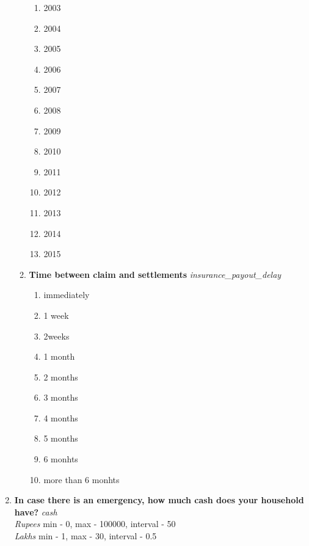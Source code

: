 \documentclass{article}
\begin{document}
\begin{enumerate}
\begin{enumerate}[label*=\arabic*.]
\begin{enumerate}
\item 2003
\item 2004
\item 2005
\item 2006
\item 2007
\item 2008
\item 2009
\item 2010
\item 2011
\item 2012
\item 2013
\item 2014
\item 2015
\end{enumerate}
\item {\bfseries Time between claim and settlements}\emph{ insurance\_payout\_delay }
\begin{enumerate}
\item immediately
\item 1 week
\item 2weeks
\item 1 month
\item 2 months
\item 3 months
\item 4 months
\item 5 months
\item 6 monhts
\item more than 6 monhts
\end{enumerate}
\end{enumerate}
\item {\bfseries In case there is an emergency, how much cash does your household have? }\emph{ cash }
\\ \emph{ Rupees }min - 0, max - 100000, interval - 50
\\ \emph{ Lakhs }min - 1, max - 30, interval - 0.5


\end{enumerate}
\end{document}
